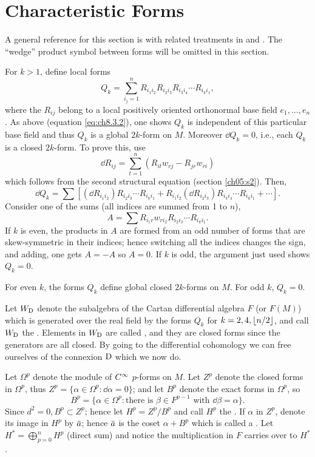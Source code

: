 \documentclass[../main]{subfiles}
\begin{document}
\section{Characteristic Forms}\label{ch08:s4}

A general reference for this section is \cite{chern1951topics} with related treatments in \cite{adler1957characteristic} and \cite{Cartan1925}. The ``wedge'' product symbol between forms will be omitted in this section.

For $k>1$, define local forms
\[Q_k=\sum_{i_j=1}^n R_{i_1 i_2} R_{i_2 i_3} R_{i_3 i_4} \cdots R_{i_ki_1},\]
where the $R_{i j}$ belong to a local positively oriented orthonormal base field $e_1, \dots, e_n$. As above (equation \ref{eq:ch8.3.2}), one shows $Q_k$ is independent of this particular base field and thus $Q_k$ is a global $2k$-form on $M$. Moreover $\dd Q_k=0$, i.e., each $Q_k$ is a closed $2k$-form. To prove this, use
\[\dd R_{i j}=\sum_{t=1}^n(R_{it}w_{rj}-R_{jr} w_{ri})\]
which follows from the second structural equation (section \ref{ch05:s2}). Then,
\[\dd Q_k=\sum[(\dd R_{i_1 i_2})R_{i_2 i_3}\cdots R_{i_k i_1}+R_{i_1 i_2}(\dd R_{i_2 i_3})R_{i_3 i_4}\cdots R_{i_k i_1}+\cdots].\]
Consider one of the sums (all indices are summed from 1 to $n$), \[A=\sum R_{i_1r}w_{ri_2}R_{i_2i_3}\cdots R_{i_ki_1}.\] If $k$ is even, the products in $A$ are formed from an odd number of forms that are skew-symmetric in their indices; hence switching all the indices changes the sign, and adding, one gets $A=-A$ so $A=0$. If $k$ is odd, the argument just used shows $Q_k=0$.



\begin{proposition} \label{prop:ch8.4.1}
For even $k$, the forms $Q_k$ define global closed $2 k$-forms on $M$. For odd $k$, $Q_k=0$.
\end{proposition}



Let $W_{\mathrm{D}}$ denote the subalgebra of the Cartan differential algebra $F$ (or $F(M)$) which is generated over the real field by the forms $Q_k$ for $k=2,4,\left\lfloor n/2\right\rfloor$, and call $W_{\mathrm{D}}$ the . Elements in $W_{\mathrm{D}}$ are called , and they are closed forms since the generators are all closed. By going to the differential cohomology we can free ourselves of the connexion $\mathrm{D}$ which we now do.

Let $\Omega^p$ denote the module of $C^\infty$ $p$-forms on $M$. Let $Z^p$ denote the closed forms in $\Omega^p$, thus $Z^p=\{\alpha\in \Omega^p:\dd \alpha=0\}$; and let $B^p$ denote the exact forms in $\Omega^p$, so \[B^p=\{\alpha\in \Omega^p:\text{there is }\beta\in F^{p-1}\text{ with }\dd\beta=\alpha\}.\] Since $d^2=0, B^p \subset Z^p$; hence let $H^p=Z^p/B^p$ and call $H^p$ the . If $\alpha$ in $Z^p$, denote its image in $H^p$ by $\xoverline{a}$; hence $\xoverline{a}$ is the coset $\alpha+B^p$ which is called a . Let $H^*=\bigoplus_{p=0}^nH^p$ (direct sum) and notice the multiplication in $F$ carries over to $H^*$.
\end{document}
